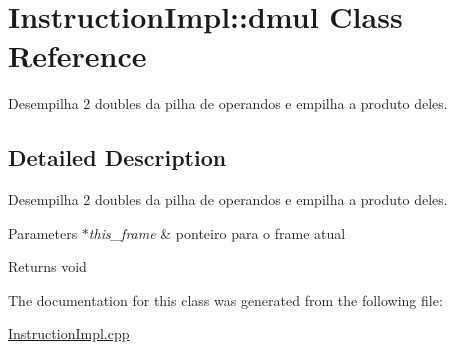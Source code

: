 \hypertarget{class_instruction_impl_1_1dmul}{}\section{Instruction\+Impl\+:\+:dmul Class Reference}
\label{class_instruction_impl_1_1dmul}


Desempilha 2 doubles da pilha de operandos e empilha a produto deles.  




\subsection{Detailed Description}
Desempilha 2 doubles da pilha de operandos e empilha a produto deles. 


\begin{DoxyParams}{Parameters}
{\em $\ast$this\+\_\+frame} & ponteiro para o frame atual \\
\hline
\end{DoxyParams}
\begin{DoxyReturn}{Returns}
void 
\end{DoxyReturn}


The documentation for this class was generated from the following file\+:\begin{DoxyCompactItemize}
\item 
\hyperlink{_instruction_impl_8cpp}{Instruction\+Impl.\+cpp}\end{DoxyCompactItemize}
